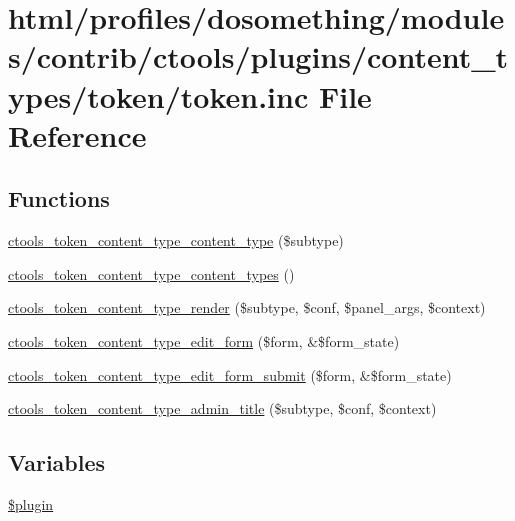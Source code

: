 \hypertarget{content__types_2token_2token_8inc}{
\section{html/profiles/dosomething/modules/contrib/ctools/plugins/content\_\-types/token/token.inc File Reference}
\label{content__types_2token_2token_8inc}
}
\subsection*{Functions}
\begin{DoxyCompactItemize}
\item 
\hyperlink{content__types_2token_2token_8inc_a354dcbc5f21429cb31aea2c89389461d}{ctools\_\-token\_\-content\_\-type\_\-content\_\-type} (\$subtype)
\item 
\hyperlink{content__types_2token_2token_8inc_a339cc78432c8b1a76bef18ec35a9ae7b}{ctools\_\-token\_\-content\_\-type\_\-content\_\-types} ()
\item 
\hyperlink{content__types_2token_2token_8inc_a1f607523b748a43a0addb1dc3cd85823}{ctools\_\-token\_\-content\_\-type\_\-render} (\$subtype, \$conf, \$panel\_\-args, \$context)
\item 
\hyperlink{content__types_2token_2token_8inc_a140f13c747191e1847868eac314678ba}{ctools\_\-token\_\-content\_\-type\_\-edit\_\-form} (\$form, \&\$form\_\-state)
\item 
\hyperlink{content__types_2token_2token_8inc_a37930c4b24c45b1463e0659a50e8786b}{ctools\_\-token\_\-content\_\-type\_\-edit\_\-form\_\-submit} (\$form, \&\$form\_\-state)
\item 
\hyperlink{content__types_2token_2token_8inc_acf7c27f3aec78e6b907806c2527263a2}{ctools\_\-token\_\-content\_\-type\_\-admin\_\-title} (\$subtype, \$conf, \$context)
\end{DoxyCompactItemize}
\subsection*{Variables}
\begin{DoxyCompactItemize}
\item 
\hyperlink{content__types_2token_2token_8inc_ada8a7130088351710bb02ed622d6bf65}{\$plugin}
\end{DoxyCompactItemize}


